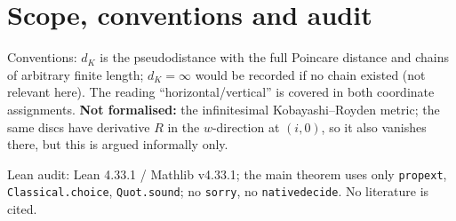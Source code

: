 \documentclass[11pt]{article}
\theoremstyle{definition}
\renewcommand{\_}{\oldus\allowbreak}
\begin{document}
\section{Scope, conventions and audit}

Conventions: $d_K$ is the pseudodistance with the full Poincare distance and chains of arbitrary finite length;
$d_K=\infty$ would be recorded if no chain existed (not relevant here). The reading ``horizontal/vertical''
is covered in both coordinate assignments. \textbf{Not formalised:} the infinitesimal Kobayashi--Royden metric; the
same discs have derivative $R$ in the $w$-direction at $(i,0)$, so it also vanishes there, but this is argued
informally only.

Lean audit: Lean 4.33.1 / Mathlib v4.33.1; the main theorem uses only \texttt{propext}, \texttt{Classical.choice},
\texttt{Quot.sound}; no \texttt{sorry}, no \texttt{native\_decide}. No literature is cited.
\end{document}
